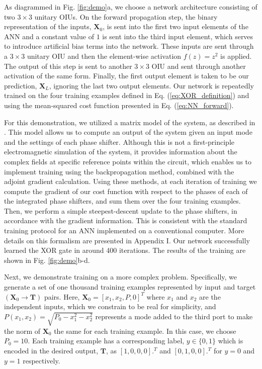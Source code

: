 As diagrammed in Fig. \ref{fig:demo}a, we choose a network architecture consisting of two $3 \times 3$ unitary OIUs.  On the forward propagation step, the binary representation of the inputs, $\textbf{X}_0$, is sent into the first two input elements of the ANN and a constant value of $1$ is sent into the third input element, which serves to introduce artificial bias terms into the network.  These inputs are sent through a $3 \times 3$ unitary OIU and then the element-wise activation $f(z) = z^2$ is applied.  The output of this step is sent to another $3 \times 3$ OIU and sent through another activation of the same form.  Finally, the first output element is taken to be our prediction, $\textbf{X}_L$, ignoring the last two output elements.  Our network is repeatedly trained on the four training examples defined in Eq. (\ref{eq:XOR_definition}) and using the mean-squared cost function presented in Eq. (\ref{eq:NN_forward}).

For this demonstration, we utilized a matrix model of the system, as described in \cite{Reck1994,Clements2016}.  This model allows us to compute an output of the system given an input mode and the settings of each phase shifter.  Although this is not a first-principle electromagnetic simulation of the system, it provides information about the complex fields at specific reference points within the circuit, which enables us to implement training using the backpropagation method, combined with the adjoint gradient calculation.  Using these methods, at each iteration of training we compute the gradient of  our cost function with respect to the phases of each of the integrated phase shifters, and sum them over the four training examples.  Then, we perform a simple steepest-descent update to the phase shifters, in accordance with the gradient information. This is consistent with the standard training protocol for an ANN implemented on a conventional computer.  More details on this formalism are presented in Appendix I.  Our network successfully learned the XOR gate in around 400 iterations. The results of the training are shown in Fig. \ref{fig:demo}b-d.

Next, we demonstrate training on a more complex problem. Specifically, we generate a set of one thousand training examples represented by input and target $(\mathbf{X}_0 \to \mathbf{T})$ pairs. Here, $\mathbf{X}_0 = [x_1, x_2, P, 0]^T$ where $x_1$ and $x_2$ are the independent inputs, which we constrain to be real for simplicity, and $P(x_1, x_2)= \sqrt{P_0-x_1^2-x_2^2}$ represents a mode added to the third port to make the norm of $\mathbf{X}_0$ the same for each training example.  In this case, we choose $P_0 = 10$.  Each training example has a corresponding label, $y \in \{0,1\}$ which is encoded in the desired output, $\mathbf{T}$, as $[1, 0, 0, 0].^T$ and $[0, 1, 0, 0].^T$ for $y = 0$ and $y=1$ respectively.

